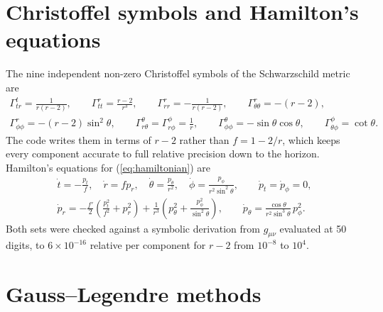 \section{Christoffel symbols and Hamilton's equations}
\label{app:christoffel}

The nine independent non-zero Christoffel symbols of the Schwarzschild metric are
\begin{gather*}
\Gamma^t_{tr} = \frac{1}{r(r - 2)}, \qquad
\Gamma^r_{tt} = \frac{r - 2}{r^3}, \qquad
\Gamma^r_{rr} = -\frac{1}{r(r - 2)}, \qquad
\Gamma^r_{\theta\theta} = -(r - 2), \\
\Gamma^r_{\phi\phi} = -(r - 2)\sin^2\theta, \qquad
\Gamma^\theta_{r\theta} = \Gamma^\phi_{r\phi} = \frac1r, \qquad
\Gamma^\theta_{\phi\phi} = -\sin\theta\cos\theta, \qquad
\Gamma^\phi_{\theta\phi} = \cot\theta .
\end{gather*}
The code writes them in terms of $r - 2$ rather than $f = 1 - 2/r$, which keeps every
component accurate to full relative precision down to the horizon. Hamilton's equations for
(\ref{eq:hamiltonian}) are
\begin{gather*}
\dot t = -\frac{p_t}{f}, \quad \dot r = f p_r, \quad \dot\theta = \frac{p_\theta}{r^2}, \quad
\dot\phi = \frac{p_\phi}{r^2\sin^2\theta}, \qquad \dot p_t = \dot p_\phi = 0, \\
\dot p_r = -\frac{f'}{2}\left(\frac{p_t^2}{f^2} + p_r^2\right)
  + \frac{1}{r^3}\left(p_\theta^2 + \frac{p_\phi^2}{\sin^2\theta}\right), \qquad
\dot p_\theta = \frac{\cos\theta}{r^2\sin^3\theta}\,p_\phi^2 .
\end{gather*}
Both sets were checked against a symbolic derivation from $g_{\mu\nu}$ evaluated at 50 digits,
to $6\times10^{-16}$ relative per component for $r - 2$ from $10^{-8}$ to $10^4$.

\section{Gauss--Legendre methods}
\label{app:gauss}

